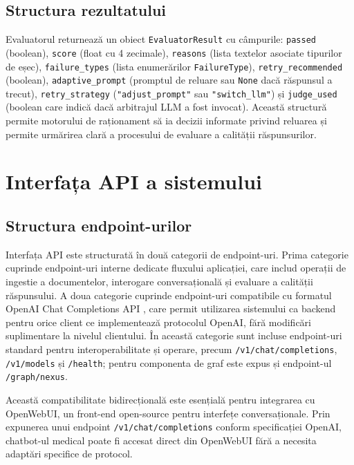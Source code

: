 \documentclass[12pt, a4paper, oneside, romanian]{teza-upb}
\begin{document}
\subsection{Structura rezultatului}

Evaluatorul returnează un obiect \texttt{EvaluatorResult} cu câmpurile: \texttt{passed} (boolean), \texttt{score} (float cu 4 zecimale), \texttt{reasons} (lista textelor asociate tipurilor de eșec), \texttt{failure\_types} (lista enumerărilor \texttt{FailureType}), \texttt{retry\_recommended} (boolean), \texttt{adaptive\_prompt} (promptul de reluare sau \texttt{None} dacă răspunsul a trecut), \texttt{retry\_strategy} (\texttt{"adjust\_prompt"} sau \texttt{"switch\_llm"}) și \texttt{judge\_used} (boolean care indică dacă arbitrajul LLM a fost invocat). Această structură permite motorului de raționament să ia decizii informate privind reluarea și permite urmărirea clară a procesului de evaluare a calității răspunsurilor.


\section{Interfața API a sistemului}

\subsection{Structura endpoint-urilor}

Interfața API este structurată în două categorii de endpoint-uri. Prima categorie cuprinde endpoint-uri interne dedicate fluxului aplicației, care includ operații de ingestie a documentelor, interogare conversațională și evaluare a calității răspunsului. A doua categorie cuprinde endpoint-uri compatibile cu formatul OpenAI Chat Completions API \cite{openai_api}, care permit utilizarea sistemului ca backend pentru orice client ce implementează protocolul OpenAI, fără modificări suplimentare la nivelul clientului. În această categorie sunt incluse endpoint-uri standard pentru interoperabilitate și operare, precum \texttt{/v1/chat/completions}, \texttt{/v1/models} și \texttt{/health}; pentru componenta de graf este expus și endpoint-ul \texttt{/graph/nexus}.

Această compatibilitate bidirecțională este esențială pentru integrarea cu OpenWebUI, un front-end open-source pentru interfețe conversaționale. Prin expunerea unui endpoint \texttt{/v1/chat/completions} conform specificației OpenAI, chatbot-ul medical poate fi accesat direct din OpenWebUI fără a necesita adaptări specifice de protocol.
\end{document}
